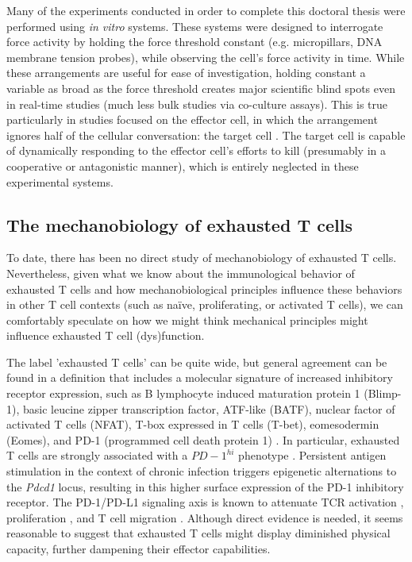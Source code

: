 Many of the experiments conducted in order to complete this doctoral thesis were performed using \textit{in vitro} systems. These systems were designed to interrogate force activity by holding the force threshold constant (e.g. micropillars, DNA membrane tension probes), while observing the cell's force activity in time. While these arrangements are useful for ease of investigation, holding constant a variable as broad as the force threshold creates major scientific blind spots even in real-time studies (much less bulk studies via co-culture assays). This is true particularly in studies focused on the effector cell, in which the arrangement ignores half of the cellular conversation: the target cell \cite{Tello-lafoz2021}. The target cell is capable of dynamically responding to the effector cell's efforts to kill (presumably in a cooperative or antagonistic manner), which is entirely neglected in these experimental systems. 

\subsection{The mechanobiology of exhausted T cells}

To date, there has been no direct study of mechanobiology of exhausted T cells. Nevertheless, given what we know about the immunological behavior of exhausted T cells and how mechanobiological principles influence these behaviors in other T cell contexts (such as na{\"i}ve, proliferating, or activated T cells), we can comfortably speculate on how we might think mechanical principles might influence exhausted T cell (dys)function.

The label 'exhausted T cells' can be quite wide, but general agreement can be found in a definition that includes a molecular signature of increased inhibitory receptor expression, such as B lymphocyte induced maturation protein 1 (Blimp-1), basic leucine zipper transcription factor, ATF-like (BATF), nuclear factor of activated T cells (NFAT), T-box expressed in T cells (T-bet), eomesodermin (Eomes), and PD-1 (programmed cell death protein 1) \cite{Wherry2011, Quigley2010, Keir2008, Doering2012, Wherry2007, Wang2012,  Lazarevic2013, Rangachari2012, Shin2009, Paley2012, Larsson2013}. In particular, exhausted T cells are strongly associated with a $PD-1^{hi}$ phenotype \cite{Keir2008}. Persistent antigen stimulation in the context of chronic infection triggers epigenetic alternations to the \textit{Pdcd1} locus, resulting in this higher surface expression of the PD-1 inhibitory receptor. The PD-1/PD-L1 signaling axis is known to attenuate TCR activation \cite{Mizuno2019}, proliferation \cite{Schietinger2014}, and T cell migration \cite{Zinselmeyer2013}. Although direct evidence is needed, it seems reasonable to suggest that exhausted T cells might display diminished physical capacity, further dampening their effector capabilities.

